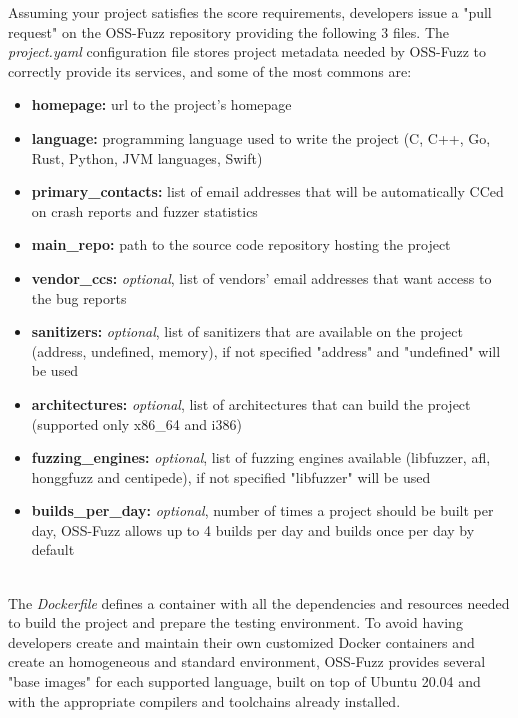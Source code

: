 \newpage
Assuming your project satisfies the score requirements, developers issue a "pull request" on the OSS-Fuzz repository providing the following 3 files.
\newline \newline
The \textit{project.yaml} configuration file stores project metadata needed by OSS-Fuzz to correctly provide its services, and some of the most commons are:
\begin{itemize}
    \item \textbf{homepage:} url to the project's homepage
    \item \textbf{language:} programming language used to write the project (C, C++, Go, Rust, Python, JVM languages, Swift)
    \item \textbf{primary\_contacts:} list of email addresses that will be automatically CCed on crash reports and fuzzer statistics
    \item \textbf{main\_repo:} path to the source code repository hosting the project
    \item \textbf{vendor\_ccs:} \textit{optional}, list of vendors' email addresses that want access to the bug reports
    \item \textbf{sanitizers:} \textit{optional}, list of sanitizers that are available on the project (address, undefined, memory), if not specified "address" and "undefined" will be used
    \item \textbf{architectures:} \textit{optional}, list of architectures that can build the project (supported only x86\_64 and i386)
    \item \textbf{fuzzing\_engines:} \textit{optional}, list of fuzzing engines available (libfuzzer, afl, honggfuzz and centipede), if not specified "libfuzzer" will be used
    \item \textbf{builds\_per\_day:} \textit{optional}, number of times a project should be built per day, OSS-Fuzz allows up to 4 builds per day and builds once per day by default
\end{itemize}
\ \\
The \textit{Dockerfile} defines a container with all the dependencies and resources needed to build the project and prepare the testing environment.
\newline
To avoid having developers create and maintain their own customized Docker containers and create an homogeneous and standard environment, OSS-Fuzz provides several "base images" for each supported language, built on top of Ubuntu 20.04 and with the appropriate compilers and toolchains already installed.
